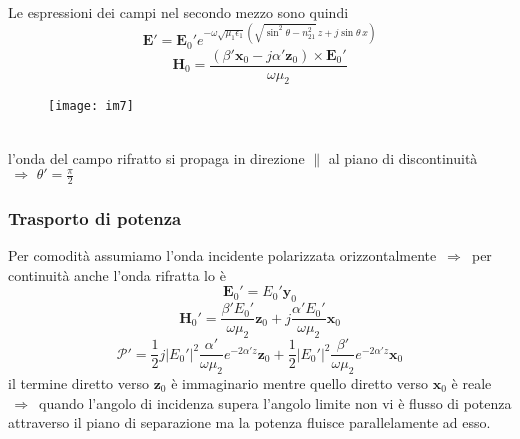 \documentclass[a4paper]{article}
\begin{document}
Le espressioni dei campi nel secondo mezzo sono quindi
\begin{equation*}
\textbf{E}'=\textbf{E}_0'e^{-\omega\sqrt{\mu_1\epsilon_1}\left(\sqrt{\sin^2\theta-n_{21}^2}\,z+j\sin\theta\,x\right)}
\end{equation*}
\begin{equation*}
\textbf{H}_0=\frac{(\beta'\textbf{x}_0-j\alpha'\textbf{z}_0)\times\textbf{E}_0'}{\omega\mu_2}
\end{equation*}
\begin{figure}[ht] 
\centering
\texttt{[image: im7]}
\end{figure}
\\l'onda del campo rifratto si propaga in direzione $\parallel$ al piano di discontinuità $\,\Rightarrow\,\,\theta'=\frac{\pi}{2}$
\subsubsection*{Trasporto di potenza}
Per comodità assumiamo l'onda incidente polarizzata orizzontalmente $\,\Rightarrow\,$ per continuità anche l'onda rifratta lo è
\begin{equation*}
\textbf{E}_0'=E_0'\textbf{y}_0
\end{equation*}
\begin{equation*}
\textbf{H}_0'=\frac{\beta'E_0'}{\omega\mu_2}\textbf{z}_0+j\frac{\alpha'E_0'}{\omega\mu_2}\textbf{x}_0
\end{equation*}
\begin{equation*}
\bm{\mathcal{P}'}=\frac{1}{2}j|E_0'|^2\frac{\alpha'}{\omega\mu_2}e^{-2\alpha'z}\textbf{z}_0+\frac{1}{2}|E_0'|^2\frac{\beta'}{\omega\mu_2}e^{-2\alpha'z}\textbf{x}_0
\end{equation*}
il termine diretto verso $\textbf{z}_0$ è immaginario mentre quello diretto verso $\textbf{x}_0$ è reale $\,\Rightarrow\,$ quando l'angolo di incidenza supera l'angolo limite non vi è flusso di potenza attraverso il piano di separazione ma la potenza fluisce parallelamente ad esso.
\end{document}
